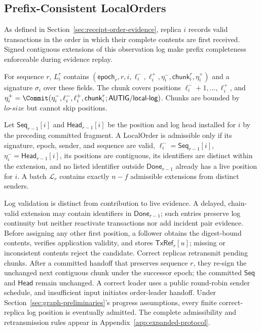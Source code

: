 \subsection{Prefix-Consistent LocalOrders}
\label{sec:prefix-consistent-localorders}

As defined in Section~\ref{sec:receipt-order-evidence}, replica $i$ records
valid transactions in the order in which their complete contents are first
received.  Signed contiguous extensions of this observation log make prefix
completeness enforceable during evidence replay.

For sequence $r$, $L_i^r$ contains
$(\mathsf{epoch}_r,r,i,\ell_i^{-},\ell_i^{+},\eta_i^{-},
\mathsf{chunk}_i^r,\eta_i^{+})$ and a signature $\sigma_i$ over these fields.
The chunk covers positions $\ell_i^{-}+1,\ldots,\ell_i^{+}$, and
$\eta_i^{+}=\Commit(\eta_i^{-},\ell_i^{-},\ell_i^{+},
\mathsf{chunk}_i^r;\mathsf{AUTIG/local\mbox{-}log})$.
Chunks are bounded by $lo\text{-}size$ but cannot skip positions.

Let $\mathsf{Seq}_{r-1}[i]$ and $\mathsf{Head}_{r-1}[i]$ be the position and
log head installed for $i$ by the preceding committed fragment.
A LocalOrder is admissible only if its signature, epoch, sender, and sequence are
valid,
$\ell_i^{-}=\mathsf{Seq}_{r-1}[i]$,
$\eta_i^{-}=\mathsf{Head}_{r-1}[i]$, its positions are contiguous, its
identifiers are distinct within the extension, and no listed identifier
outside $\mathsf{Done}_{r-1}$ already has a live position for $i$.  A batch
$\mathcal L_r$ contains exactly $n-f$ admissible extensions from distinct
senders.

Log validation is distinct from contribution to live evidence.  A delayed,
chain-valid extension may contain identifiers in $\mathsf{Done}_{r-1}$; such
entries preserve log continuity but neither reactivate transactions nor add
incident pair evidence.  Before assigning any other first position, a follower
obtains the digest-bound contents, verifies application validity, and stores
$\mathsf{TxRef}_r[u]$; missing or inconsistent contents reject the candidate.
Correct replicas retransmit pending chunks.  After a committed handoff that
preserves sequence $r$, they re-sign the unchanged next contiguous chunk under
the successor epoch; the committed $\mathsf{Seq}$ and $\mathsf{Head}$ remain
unchanged.  A correct leader uses a public round-robin sender schedule, and
insufficient input initiates order-leader handoff.  Under
Section~\ref{sec:graph-preliminaries}'s progress assumptions,
every finite correct-replica log position is eventually admitted.  The complete
admissibility and retransmission rules appear in
Appendix~\ref{app:expanded-protocol}.

